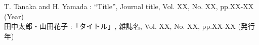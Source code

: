  T. Tanaka and H. Yamada : ``Title'', Journal title, Vol. XX, No. XX, pp.XX-XX (Year)
\\ 田中太郎・山田花子 :「タイトル」, 雑誌名, Vol. XX, No. XX, pp.XX-XX (発行年)